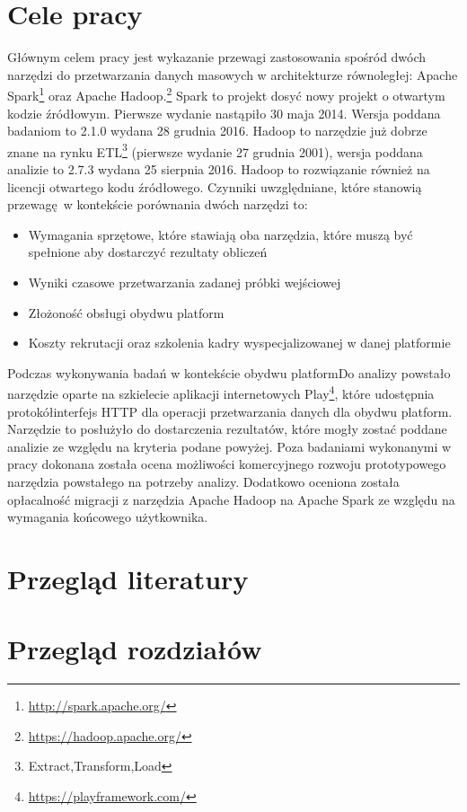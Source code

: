 \section{Cele pracy}
Głównym celem pracy jest wykazanie przewagi zastosowania spośród dwóch narzędzi do przetwarzania danych masowych w architekturze równoległej: Apache Spark\footnote{\url{http://spark.apache.org/}} oraz Apache Hadoop.\footnote{\url{https://hadoop.apache.org/}} Spark to projekt dosyć nowy projekt o otwartym kodzie źródłowym. Pierwsze wydanie nastąpiło 30 maja 2014. Wersja poddana badaniom to 2.1.0 wydana 28 grudnia 2016. Hadoop to narzędzie już dobrze znane na rynku ETL\footnote{Extract,Transform,Load} (pierwsze wydanie 27 grudnia 2001), wersja poddana analizie to 2.7.3 wydana 25 sierpnia 2016. Hadoop to rozwiązanie również na licencji otwartego kodu źródłowego. Czynniki uwzględniane, które stanowią przewagę w kontekście porównania dwóch narzędzi to:
\begin{itemize}
	\item Wymagania sprzętowe, które stawiają oba narzędzia, które muszą być spełnione aby dostarczyć rezultaty obliczeń
	\item Wyniki czasowe przetwarzania zadanej próbki wejściowej
	\item Złożoność obsługi obydwu platform
	\item Koszty rekrutacji oraz szkolenia kadry wyspecjalizowanej w danej platformie
\end{itemize}
Podczas wykonywania badań w kontekście obydwu platformDo analizy powstało narzędzie oparte na szkielecie aplikacji internetowych Play\footnote{\url{https://playframework.com/}}, które udostępnia protokółinterfejs HTTP dla operacji przetwarzania danych dla obydwu platform. Narzędzie to posłużyło do dostarczenia rezultatów, które mogły zostać poddane analizie ze względu na kryteria podane powyżej. Poza badaniami wykonanymi w pracy dokonana została ocena możliwości komercyjnego rozwoju prototypowego narzędzia powstałego na potrzeby analizy. Dodatkowo oceniona została opłacalność migracji z narzędzia Apache Hadoop na Apache Spark ze względu na wymagania końcowego użytkownika. 

\section{Przegląd literatury}
\section{Przegląd rozdziałów}
